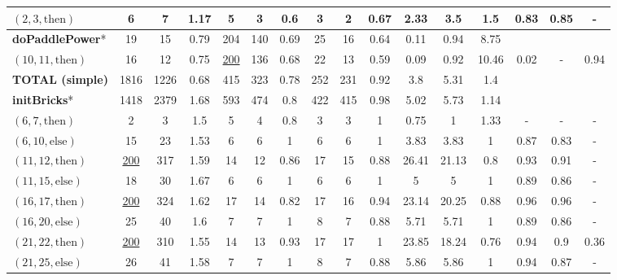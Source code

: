 \documentclass[sigconf,review,anonymous]{acmart}
\newcommand{\thenBr}{\text{then}}
\newcommand{\elseBr}{\text{else}}
\newcommand{\un}[1]{\underline{#1}}
\begin{document}
\begin{table}[!t]
\begin{tabular}{l|ccc|ccc|ccc|ccc|ccc}
    $(2,3,\thenBr)$          & 6        & 7    & 1.17      & 5  & 3 & 0.6               & 3  & 2  & 0.67               & 2.33   & 3.5  & 1.5    & 0.83 & 0.85 & -  \\
    \hline
   \textbf{doPaddlePower}*   & 19       & 15   & 0.79      & 204  & 140 & 0.69          & 25 & 16  & 0.64              & 0.11   & 0.94 & 8.75   &       &      &      \\
    $(10,11,\thenBr)$        & 16       & 12   & 0.75      & \un{200} & 136 & 0.68      & 22 & 13  & 0.59              & 0.09   & 0.92 & 10.46  &  0.02 & - & 0.94 \\
   \midrule
    \textbf{TOTAL (simple)}          & 1816      & 1226 & 0.68      & 415 & 323 & 0.78          & 252 & 231 & 0.92              & 3.8    & 5.31  & 1.4       &   &   &    \\  
    \bottomrule
   \textbf{initBricks}*      & 1418     & 2379 & 1.68      & 593  & 474 & 0.8           & 422 & 415 & 0.98             & 5.02   & 5.73  & 1.14   &      &      &       \\
    $(6,7,\thenBr)$          & 2        & 3    & 1.5       & 5    & 4   & 0.8           & 3   & 3   & 1                & 0.75   & 1     & 1.33   & - & -  & -   \\
    $(6,10,\elseBr)$         & 15       & 23   & 1.53      & 6    & 6   & 1             & 6   & 6   & 1                & 3.83   & 3.83  & 1      & 0.87 & 0.83 & -   \\
    $(11,12,\thenBr)$        & \un{200} & 317  & 1.59      & 14   & 12  & 0.86          & 17  & 15  & 0.88             & 26.41  & 21.13 & 0.8    & 0.93 & 0.91 & -  \\
    $(11,15,\elseBr)$        & 18       & 30   & 1.67      & 6    & 6   & 1             & 6   & 6   & 1                & 5      & 5     & 1      & 0.89 & 0.86 & -  \\
    $(16,17,\thenBr)$        & \un{200} & 324  & 1.62      & 17   & 14  & 0.82          & 17  & 16  & 0.94             & 23.14  & 20.25 & 0.88   & 0.96 & 0.96 & -  \\
    $(16,20,\elseBr)$        & 25       & 40   & 1.6       & 7    & 7   & 1             & 8   & 7   & 0.88             & 5.71   & 5.71  & 1      & 0.89 & 0.86 & -  \\
    $(21,22,\thenBr)$        & \un{200} & 310  & 1.55      & 14   & 13  & 0.93          & 17  & 17  & 1                & 23.85  & 18.24 & 0.76   & 0.94 & 0.9  & 0.36  \\
    $(21,25,\elseBr)$        & 26       & 41   & 1.58      & 7    & 7   & 1             & 8   & 7   & 0.88             & 5.86   & 5.86  & 1      & 0.94 & 0.87 & -  \\

\end{tabular}
\end{table}
\end{document}
